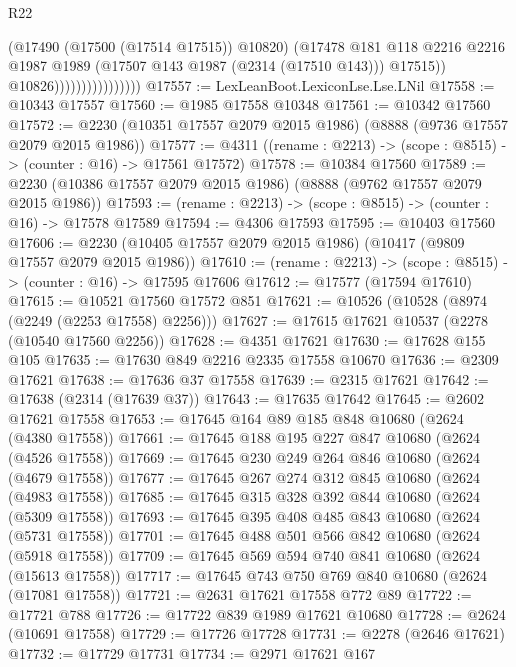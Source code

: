 \begin{lexlean}{R22}
\begin{coremodule}
                                      (@17490 (@17500 (@17514 @17515)) @10820)
                                      (@17478
                                        @181
                                        @118
                                        @2216
                                        @2216
                                        @1987
                                        @1989
                                        (@17507 @143 @1987 (@2314 (@17510 @143)))
                                        @17515))
                                    @10826))))))))))))))))
@17557 := LexLeanBoot.LexiconLse.Lse.LNil
@17558 := @10343 @17557
@17560 := @1985 @17558 @10348
@17561 := @10342 @17560
@17572 := @2230 (@10351 @17557 @2079 @2015 @1986) (@8888 (@9736 @17557 @2079 @2015 @1986))
@17577 := @4311 ((rename : @2213) -> (scope : @8515) -> (counter : @16) -> @17561 @17572)
@17578 := @10384 @17560
@17589 := @2230 (@10386 @17557 @2079 @2015 @1986) (@8888 (@9762 @17557 @2079 @2015 @1986))
@17593 := (rename : @2213) -> (scope : @8515) -> (counter : @16) -> @17578 @17589
@17594 := @4306 @17593
@17595 := @10403 @17560
@17606 := @2230 (@10405 @17557 @2079 @2015 @1986) (@10417 (@9809 @17557 @2079 @2015 @1986))
@17610 := (rename : @2213) -> (scope : @8515) -> (counter : @16) -> @17595 @17606
@17612 := @17577 (@17594 @17610)
@17615 := @10521 @17560 @17572 @851
@17621 := @10526 (@10528 (@8974 (@2249 (@2253 @17558) @2256)))
@17627 := @17615 @17621 @10537 (@2278 (@10540 @17560 @2256))
@17628 := @4351 @17621
@17630 := @17628 @155 @105
@17635 := @17630 @849 @2216 @2335 @17558 @10670
@17636 := @2309 @17621
@17638 := @17636 @37 @17558
@17639 := @2315 @17621
@17642 := @17638 (@2314 (@17639 @37))
@17643 := @17635 @17642
@17645 := @2602 @17621 @17558
@17653 := @17645 @164 @89 @185 @848 @10680 (@2624 (@4380 @17558))
@17661 := @17645 @188 @195 @227 @847 @10680 (@2624 (@4526 @17558))
@17669 := @17645 @230 @249 @264 @846 @10680 (@2624 (@4679 @17558))
@17677 := @17645 @267 @274 @312 @845 @10680 (@2624 (@4983 @17558))
@17685 := @17645 @315 @328 @392 @844 @10680 (@2624 (@5309 @17558))
@17693 := @17645 @395 @408 @485 @843 @10680 (@2624 (@5731 @17558))
@17701 := @17645 @488 @501 @566 @842 @10680 (@2624 (@5918 @17558))
@17709 := @17645 @569 @594 @740 @841 @10680 (@2624 (@15613 @17558))
@17717 := @17645 @743 @750 @769 @840 @10680 (@2624 (@17081 @17558))
@17721 := @2631 @17621 @17558 @772 @89
@17722 := @17721 @788
@17726 := @17722 @839 @1989 @17621 @10680
@17728 := @2624 (@10691 @17558)
@17729 := @17726 @17728
@17731 := @2278 (@2646 @17621)
@17732 := @17729 @17731
@17734 := @2971 @17621 @167

\end{coremodule}
\end{lexlean}
